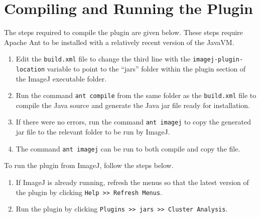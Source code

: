 
\section{Compiling and Running the Plugin}
\label{sec:running_the_plugin}

The steps required to compile the plugin are given below. These steps require
Apache Ant to be installed with a relatively recent version of the JavaVM\@.
\begin{enumerate}
	\item Edit the \texttt{build.xml} file to change the third line with the
		\texttt{imagej-plugin-location} variable to point to the ``jars''
		folder within the plugin section of the ImageJ executable folder.
	\item Run the command \texttt{ant compile} from the same folder as the
		\texttt{build.xml} file to compile the Java source and generate the
		Java jar file ready for installation.
	\item If there were no errors, run the command \texttt{ant imagej} to copy
		the generated jar file to the relevant folder to be run by ImageJ.
	\item The command \texttt{ant imagej} can be run to both compile and copy
		the file.
\end{enumerate}

To run the plugin from ImageJ, follow the steps below.
\begin{enumerate}
	\item If ImageJ is already running, refresh the menus so that the latest
		version of the plugin by clicking \texttt{Help >> Refresh Menus}.
	\item Run the plugin by clicking \texttt{Plugins >> jars >> Cluster
		Analysis}.
\end{enumerate}

